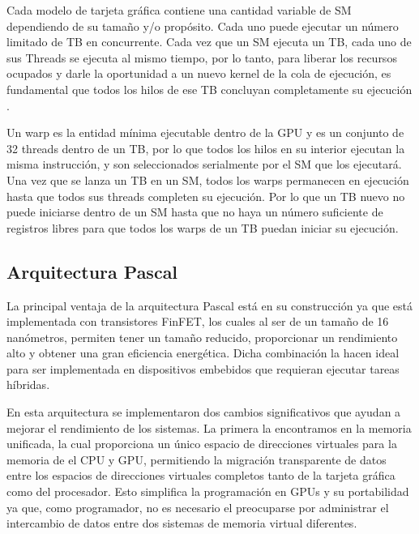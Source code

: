     Cada modelo de tarjeta gráfica contiene una cantidad variable de SM dependiendo de su tamaño y/o propósito. Cada uno puede ejecutar un número limitado de TB en concurrente. 
    Cada vez que un SM ejecuta un TB, cada uno de sus Threads se ejecuta al mismo tiempo, por lo tanto, para liberar los recursos ocupados y darle la oportunidad a un nuevo kernel de la cola de ejecución, es fundamental que todos los hilos de ese TB concluyan completamente su ejecución \cite{CuLect2}.
    \newline
    
    Un warp es la entidad mínima ejecutable dentro de la GPU y es un conjunto de 32 threads dentro de un TB, por lo que todos los hilos en su interior ejecutan la misma instrucción, y son seleccionados serialmente por el SM que los ejecutará. \cite{WarpLvl}
Una vez que se lanza un TB en un SM, todos los warps permanecen en ejecución hasta que todos sus threads completen su ejecución. Por lo que un TB nuevo no puede iniciarse dentro de un SM hasta que no haya un número suficiente de registros libres para que todos los warps de un TB puedan iniciar su ejecución.
    

    \subsection{Arquitectura Pascal}\label{secc:arqPas}

    La principal ventaja de la arquitectura Pascal está en su construcción ya que está implementada con transistores FinFET\cite{PasGPU}, los cuales al ser de un tamaño de 16 nanómetros, permiten tener un tamaño reducido, proporcionar un rendimiento alto y obtener una gran eficiencia energética. Dicha combinación la hacen ideal para ser implementada en dispositivos embebidos que requieran ejecutar tareas híbridas.
    \newline
   
   En esta arquitectura se implementaron dos cambios significativos que ayudan a mejorar el rendimiento de los sistemas. La primera la encontramos en la memoria unificada, la cual proporciona un único espacio de direcciones virtuales para la memoria de el CPU y GPU, permitiendo la migración transparente de datos entre los espacios de direcciones virtuales completos tanto de la tarjeta gráfica como del procesador. Esto simplifica la programación en GPUs y su portabilidad ya que, como programador, no es necesario el  preocuparse por administrar el intercambio de datos entre dos sistemas de memoria virtual diferentes\cite{WPNV}.
    \newline
   
